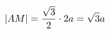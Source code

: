 \documentclass[preview]{standalone}
\begin{document}
\begin{align*}
\special{dvisvgm:raw <g id='unique000'>}|AM|=\frac{\sqrt{3}}{2}\cdot2a=\sqrt{3}a\special{dvisvgm:raw </g>}
\end{align*}
\end{document}
